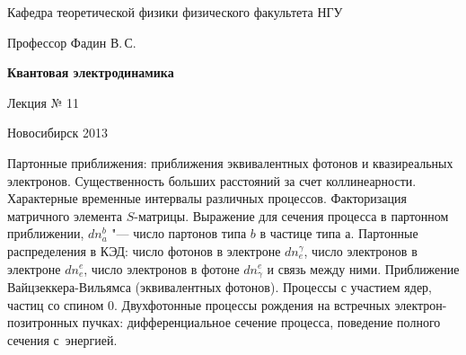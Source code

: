 \documentclass[12pt,pagesize,paper=192mm:108mm]{scrbook}
\begin{document}
\begin{titlepage}
\begin{center}
    Кафедра теоретической физики физического факультета НГУ
    \medskip

    \Large
    Профессор Фадин В.\,С.
    \bigskip

    \huge
    \textbf{Квантовая электродинамика}
    \bigskip

    \Large
    Лекция № 11
    \vfill

    \normalsize
    \vfill

    \normalsize \ccbysa\hspace{0.5em}  Новосибирск 2013
  \end{center}
\end{titlepage}
\vspace*{-1em}
\begin{center}
\vfill
  \begin{minipage}{0.65\linewidth}
    Партонные приближения: приближения эквивалентных фотонов и
    квазиреальных электронов.  Существенность больших расстояний за
    счет коллинеарности. Характерные временные интервалы различных
    процессов. Факторизация матричного элемента $S$-матрицы. Выражение
    для сечения процесса в партонном приближении, $dn_a^b$ "--- число
    партонов типа $b$ в частице типа $а$. Партонные распределения в
    КЭД: число фотонов в электроне $dn_e^\gamma$, число электронов в
    электроне $dn_e^e$, число электронов в фотоне $dn_\gamma^e$ и
    связь между ними. Приближение Вайцзеккера-Вильямса (эквивалентных
    фотонов). Процессы с участием ядер, частиц со спином
    0. Двухфотонные процессы рождения на встречных
    электрон-позитронных пучках: дифференциальное сечение процесса,
    поведение полного сечения с~энергией.
  \end{minipage}
  \vfill

\end{center}
\end{document}
